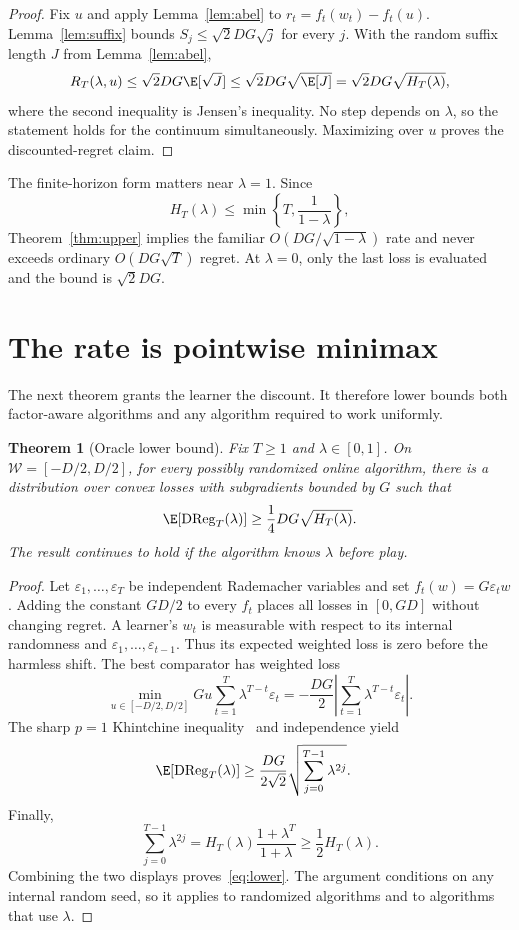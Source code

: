 \documentclass{article}
\newtheorem{theorem}{Theorem}
\newcommand{\W}{\mathcal W}
\newcommand{\DReg}{\operatorname{DReg}}
\begin{document}
\begin{proof}
Fix $u$ and apply Lemma~\ref{lem:abel} to $r_t=f_t(w_t)-f_t(u)$. Lemma~\ref{lem:suffix} bounds $S_j\le\sqrt2DG\sqrt j$ for every $j$. With the random suffix length $J$ from Lemma~\ref{lem:abel}, \[ R_T(\lambda,u)\le\sqrt2DG\E[\sqrt J]\le\sqrt2DG\sqrt{\E[J]}=\sqrt2DG\sqrt{H_T(\lambda)}, \] where the second inequality is Jensen's inequality. No step depends on $\lambda$, so the statement holds for the continuum simultaneously. Maximizing over $u$ proves the discounted-regret claim.
\end{proof}

The finite-horizon form matters near $\lambda=1$. Since \[ H_T(\lambda)\le\min\left\{T,\frac1{1-\lambda}\right\}, \] Theorem~\ref{thm:upper} implies the familiar $O(DG/\sqrt{1-\lambda})$ rate and never exceeds ordinary $O(DG\sqrt T)$ regret. At $\lambda=0$, only the last loss is evaluated and the bound is $\sqrt2DG$.

\section{The rate is pointwise minimax}
\label{sec:lower}

The next theorem grants the learner the discount. It therefore lower bounds both factor-aware algorithms and any algorithm required to work uniformly.

\begin{theorem}[Oracle lower bound]
\label{thm:lower}
Fix $T\ge1$ and $\lambda\in[0,1]$. On $\W=[-D/2,D/2]$, for every possibly randomized online algorithm, there is a distribution over convex losses with subgradients bounded by $G$ such that
\begin{equation}
\E[\DReg_T(\lambda)]\ge\frac14DG\sqrt{H_T(\lambda)}.
\label{eq:lower}
\end{equation}
The result continues to hold if the algorithm knows $\lambda$ before play.
\end{theorem}

\begin{proof}
Let $\varepsilon_1,\ldots,\varepsilon_T$ be independent Rademacher variables and set $f_t(w)=G\varepsilon_tw$. Adding the constant $GD/2$ to every $f_t$ places all losses in $[0,GD]$ without changing regret. A learner's $w_t$ is measurable with respect to its internal randomness and $\varepsilon_1,\ldots,\varepsilon_{t-1}$. Thus its expected weighted loss is zero before the harmless shift. The best comparator has weighted loss \[ \min_{u\in[-D/2,D/2]}Gu\sum_{t=1}^T\lambda^{T-t}\varepsilon_t=-\frac{DG}{2}\left|\sum_{t=1}^T\lambda^{T-t}\varepsilon_t\right|. \] The sharp $p=1$ Khintchine inequality~\citep{haagerup1981best} and independence yield
\begin{align}
\E[\DReg_T(\lambda)]
&\ge\frac{DG}{2\sqrt2}\sqrt{\sum_{j=0}^{T-1}\lambda^{2j}}.
\end{align}
Finally, \[ \sum_{j=0}^{T-1}\lambda^{2j}=H_T(\lambda)\frac{1+\lambda^T}{1+\lambda}\ge\frac12H_T(\lambda). \] Combining the two displays proves~\eqref{eq:lower}. The argument conditions on any internal random seed, so it applies to randomized algorithms and to algorithms that use $\lambda$.
\end{proof}
\end{document}

